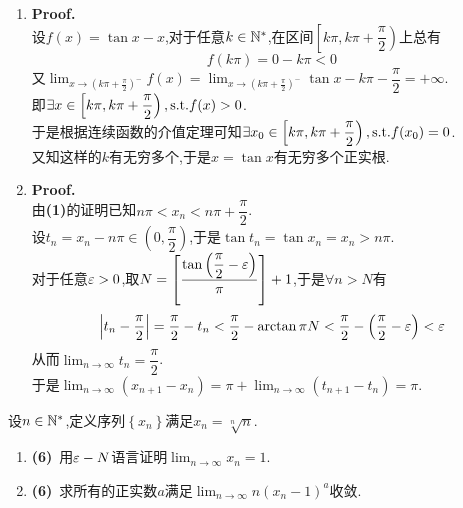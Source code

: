 \documentclass{ctexart}
\begin{document}
\begin{solution}
    \begin{enumerate}[label=\textbf{(\arabic*)}]
        \item \textbf{Proof.}\\
            设$f(x)=\tan x-x$,对于任意$k\in\mathbb{N}^*$,在区间$\left[k\pi,k\pi+\dfrac{\pi}{2}\right)$上总有
            $$f(k\pi)=0-k\pi<0$$
            又$\displaystyle\lim_{x\to\left(k\pi+\frac{\pi}{2}\right)^-}f(x)=\lim_{x\to\left(k\pi+\frac{\pi}{2}\right)^-}\tan x-k\pi-\dfrac{\pi}{2}=+\infty$.\\
            即$\exists x\in\left[k\pi,k\pi+\dfrac{\pi}{2}\right),\text{s.t.} f(x)>0$.\\
            于是根据连续函数的介值定理可知$\exists x_0\in\left[k\pi,k\pi+\dfrac{\pi}{2}\right),\text{s.t.} f(x_0)=0$.\\
            又知这样的$k$有无穷多个,于是$x=\tan x$有无穷多个正实根.
        \item \textbf{Proof.}\\
            由\textbf{(1)}的证明已知$n\pi<x_n<n\pi+\dfrac{\pi}{2}$.\\
            设$t_n=x_n-n\pi\in\left(0,\dfrac{\pi}{2}\right)$,于是$\tan t_n=\tan x_n=x_n>n\pi$.\\
            对于任意$\varepsilon>0$,取$N=\left[\dfrac{\tan\left(\dfrac{\pi}{2}-\varepsilon\right)}{\pi}\right]+1$,于是$\forall n>N$有
            $$\left|t_n-\dfrac{\pi}{2}\right|=\dfrac{\pi}{2}-t_n<\dfrac{\pi}{2}-\arctan{\pi N}<\dfrac{\pi}{2}-\left(\dfrac{\pi}{2}-\varepsilon\right)<\varepsilon$$
            从而$\displaystyle\lim_{n\to\infty}t_n=\dfrac{\pi}{2}$.\\
            于是$\displaystyle\lim_{n\to\infty}\left(x_{n+1}-x_n\right)=\pi+\lim_{n\to\infty}\left(t_{n+1}-t_n\right)=\pi$.
    \end{enumerate}
\end{solution}
\begin{problem}[8.(12\songti{分})]
    设$n\in\mathbb{N}^*$,定义序列$\left\{x_n\right\}$满足$x_n=\sqrt[n]{n}$.
    \begin{enumerate}[label=\textbf{(\arabic*)}]
        \item \textbf{(6)}\ 用$\varepsilon-N$语言证明$\displaystyle\lim_{n\to\infty}x_n=1$.
        \item \textbf{(6)}\ 求所有的正实数$a$满足$\displaystyle\lim_{n\to\infty}n(x_n-1)^a$收敛.
    \end{enumerate}
\end{problem}
\end{document}

